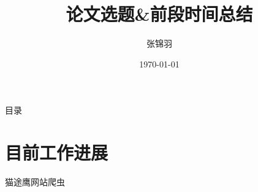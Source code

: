 \documentclass[10pt]{beamer}
\title{论文选题\&前段时间总结}
\date{\today}%
\author{张锦羽}
\institute{西安交通大学管理学院} %
\begin{document}
\begin{frame}
\titlepage
    
\end{frame}
\begin{frame}{目录}
    \tableofcontents 
\end{frame}
\section{目前工作进展}
\begin{frame}[plain]{猫途鹰网站爬虫}
    \begin{columns}
        \begin{figure}
            \centering

\end{figure}
\end{columns}
\end{frame}
\end{document}
